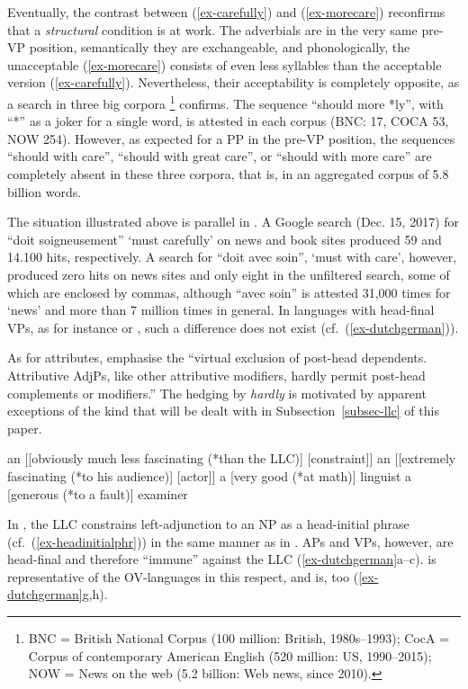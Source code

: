 \documentclass[output=paper
  ,nobabel
  ,uniformtopskip %
]{langscibook}
\begin{document}
\noindent
Eventually, the contrast between (\ref{ex-carefully}) and (\ref{ex-morecare}) reconfirms that a \emph{structural} condition is at work. The adverbials are in the very same pre-VP position, semantically they are exchangeable, and phonologically, the unacceptable (\ref{ex-morecare}) consists of even less syllables than the acceptable version (\ref{ex-carefully}). Nevertheless, their acceptability is completely opposite, as a search in three big corpora%
%
\footnote{BNC = British National Corpus (100 million: British, 1980s--1993); CocA = Corpus of contemporary American English (520 million: US, 1990--2015); NOW = News on the web (5.2 billion: Web news, since 2010).}
confirms. The sequence ``should more *ly'', with ``*'' as a joker for a single word, is attested in each corpus (BNC: 17, COCA 53, NOW 254). However, as expected for a PP in the pre-VP position, the sequences ``should with care'', ``should with great care'', or ``should with more care'' are completely absent in these three corpora, that is, in an aggregated corpus of 5.8 billion words.

The situation illustrated above is parallel in . A Google search (Dec. 15, 2017) for ``doit soigneusement'' `must carefully' on news and book sites produced 59 and 14.100 hits, respectively. A search for ``doit avec soin'', `must with care', however, produced zero hits on news sites and only eight in the unfiltered search, some of which are enclosed by commas, although ``avec soin'' is attested 31,000 times for ‘news’ and more than 7 million times in general. In languages with head-final VPs, as for instance  or , such a difference does not exist (cf.\ (\ref{ex-dutchgerman})).

As for attributes, \citet*[551]{HuddlestonPullum2002} emphasise the ``virtual exclusion of post-head dependents. Attributive AdjPs, like other attributive modifiers, hardly permit post-head complements or modifiers.'' The hedging by \emph{hardly} is motivated by apparent exceptions of the kind that will be dealt with in Subsection~\ref{subsec-llc} of this paper.

\eal\label{ex-adjunct-np}
\ex an [[obviously much less fascinating (*than the LLC)] [constraint]]
\ex an [[extremely fascinating (*to his audience)] [actor]]
\ex a [very good (*at math)] linguist
\ex a [generous (*to a fault)] examiner
\zl

\noindent
In , the LLC constrains left-adjunction to an NP as a head-initial phrase (cf.\ (\ref{ex-headinitialphr})) in the same manner as in . APs and VPs, however, are head-final and therefore ``immune'' against the LLC (\ref{ex-dutchgerman}a--c).  is representative of the  OV-languages in this respect, and  is, too (\ref{ex-dutchgerman}g,h).
\end{document}
